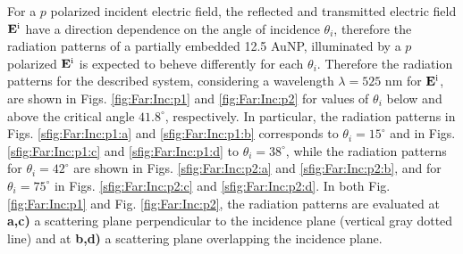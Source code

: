 For a $p$ polarized incident electric field, the reflected and transmitted electric field  $\vb{E}^\text{i}$ have a direction dependence on the angle of incidence $\theta_i$, therefore the radiation patterns of a partially embedded  12.5 AuNP, illuminated by a  $p$ polarized  $\vb{E}^\text{i}$ is expected to beheve differently for each $\theta_i$. Therefore the radiation patterns for the described system, considering a wavelength $\lambda = 525$ nm for $\vb{E}^\text{i}$, are shown in Figs. \ref{fig:Far:Inc:p1} and  \ref{fig:Far:Inc:p2} for values of $\theta_i$ below and above the critical angle $41.8^\circ$, respectively. In particular, the radiation patterns in Figs. \ref{sfig:Far:Inc:p1:a} and  \ref{sfig:Far:Inc:p1:b} corresponds to $\theta_i = 15^\circ$ and in Figs. \ref{sfig:Far:Inc:p1:c} and  \ref{sfig:Far:Inc:p1:d} to  $\theta_i = 38^\circ$, while the radiation patterns for  $\theta_i = 42^\circ$ are shown in  Figs. \ref{sfig:Far:Inc:p2:a} and  \ref{sfig:Far:Inc:p2:b}, and for $\theta_i = 75^\circ$ in  Figs. \ref{sfig:Far:Inc:p2:c} and  \ref{sfig:Far:Inc:p2:d}. In both Fig. \ref{fig:Far:Inc:p1} and Fig. \ref{fig:Far:Inc:p2}, the radiation patterns are evaluated at \textbf{a,c)}  a scattering plane perpendicular to the incidence plane (vertical gray dotted line) and  at \textbf{b,d)}  a scattering plane overlapping the incidence plane.

